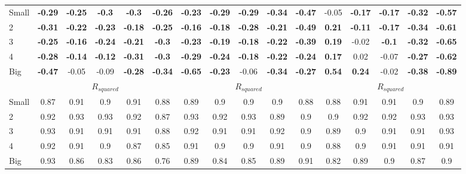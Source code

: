 \begin{table}[H]
\begin{tabular}{lccccc|ccccc|ccccc}
Small & \textbf{-0.29} & \textbf{-0.25} & \textbf{-0.3} & \textbf{-0.3} & \textbf{-0.26} & \textbf{-0.23} & \textbf{-0.29} & \textbf{-0.29} & \textbf{-0.34} & \textbf{-0.47} & -0.05 & \textbf{-0.17} & \textbf{-0.17} & \textbf{-0.32} & \textbf{-0.57} \\
2 & \textbf{-0.31} & \textbf{-0.22} & \textbf{-0.23} & \textbf{-0.18} & \textbf{-0.25} & \textbf{-0.16} & \textbf{-0.18} & \textbf{-0.28} & \textbf{-0.21} & \textbf{-0.49} & \textbf{0.21} & \textbf{-0.11} & \textbf{-0.17} & \textbf{-0.34} & \textbf{-0.61} \\
3 & \textbf{-0.25} & \textbf{-0.16} & \textbf{-0.24} & \textbf{-0.21} & \textbf{-0.3} & \textbf{-0.23} & \textbf{-0.19} & \textbf{-0.18} & \textbf{-0.22} & \textbf{-0.39} & \textbf{0.19} & -0.02 & \textbf{-0.1} & \textbf{-0.32} & \textbf{-0.65} \\
4 & \textbf{-0.28} & \textbf{-0.14} & \textbf{-0.12} & \textbf{-0.31} & \textbf{-0.3} & \textbf{-0.29} & \textbf{-0.24} & \textbf{-0.18} & \textbf{-0.22} & \textbf{-0.24} & \textbf{0.17} & 0.02 & -0.07 & \textbf{-0.27} & \textbf{-0.62} \\
Big & \textbf{-0.47} & -0.05 & -0.09 & \textbf{-0.28} & \textbf{-0.34} & \textbf{-0.65} & \textbf{-0.23} & -0.06 & \textbf{-0.34} & \textbf{-0.27} & \textbf{0.54} & \textbf{0.24} & -0.02 & \textbf{-0.38} & \textbf{-0.89} \\
 & \multicolumn{5}{c|}{$R_{squared}$} & \multicolumn{5}{c|}{$R_{squared}$} & \multicolumn{5}{c}{$R_{squared}$} \\
Small & 0.87 & 0.91 & 0.9 & 0.91 & 0.88 & 0.89 & 0.9 & 0.9 & 0.9 & 0.88 & 0.88 & 0.91 & 0.91 & 0.9 & 0.89 \\
2 & 0.92 & 0.93 & 0.93 & 0.92 & 0.87 & 0.93 & 0.92 & 0.93 & 0.89 & 0.9 & 0.9 & 0.92 & 0.92 & 0.93 & 0.93 \\
3 & 0.93 & 0.91 & 0.91 & 0.91 & 0.88 & 0.92 & 0.91 & 0.91 & 0.92 & 0.9 & 0.89 & 0.9 & 0.91 & 0.91 & 0.93 \\
4 & 0.92 & 0.91 & 0.9 & 0.87 & 0.85 & 0.91 & 0.9 & 0.9 & 0.91 & 0.9 & 0.88 & 0.9 & 0.91 & 0.91 & 0.91 \\
Big & 0.93 & 0.86 & 0.83 & 0.86 & 0.76 & 0.89 & 0.84 & 0.85 & 0.89 & 0.91 & 0.82 & 0.89 & 0.9 & 0.87 & 0.9 \\
\end{tabular}
\end{table}
